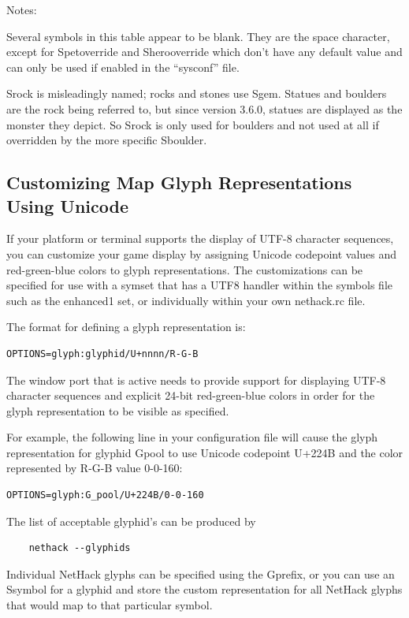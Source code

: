 \documentclass[titlepage]{article}
\begin{document}
Notes:

Several symbols in this table appear to be blank.
They are the space character, except for S\textunderscore pet\textunderscore override
and S\textunderscore hero\textunderscore override which don't have any default value
and can only be used if enabled in the ``sysconf'' file.

S\textunderscore rock is misleadingly named; rocks and stones use S\textunderscore gem.
Statues and boulders are the rock being referred to, but since
version 3.6.0, statues are displayed as the monster they depict.
So S\textunderscore rock is only used for boulders and not used at all if
overridden by the more specific S\textunderscore boulder.

\subsection*{Customizing Map Glyph Representations Using Unicode}

If your platform or terminal supports the display of UTF-8 character
sequences, you can customize your game display by assigning Unicode
codepoint values and red-green-blue colors to glyph
representations. The customizations can be specified for use with a symset that
has a UTF8 handler within the symbols file such as the enhanced1 set, or
individually within your own nethack.rc file.

The format for defining a glyph representation is:\\
\begin{verbatim}
OPTIONS=glyph:glyphid/U+nnnn/R-G-B
\end{verbatim}

The window port that is active needs to provide support for displaying UTF-8
character sequences and explicit 24-bit red-green-blue colors in order for the glyph
representation to be visible as specified.

For example, the following line in your configuration file will cause
the glyph representation for glyphid G\textunderscore pool to use Unicode codepoint
U+224B and the color represented by R-G-B value 0-0-160:\\
\begin{verbatim}
OPTIONS=glyph:G_pool/U+224B/0-0-160
\end{verbatim}

The list of acceptable glyphid's can be produced by
\begin{verbatim}
    nethack --glyphids
\end{verbatim}
Individual NetHack glyphs can be specified using the G\textunderscore prefix,
or you can use an S\textunderscore symbol for a glyphid and store the custom
representation for all NetHack glyphs that would map to that
particular symbol.
\end{document}
